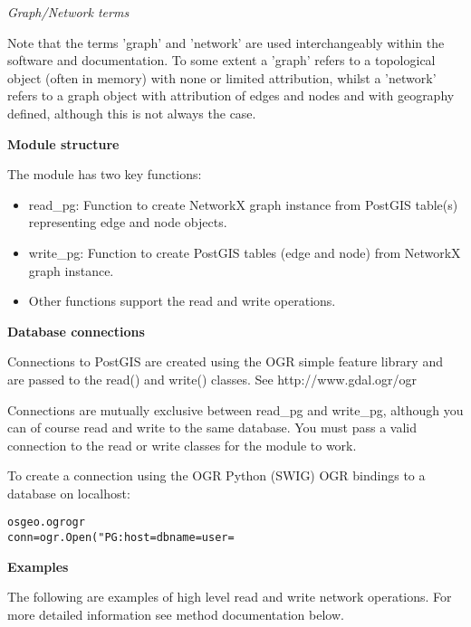 \textit{Graph/Network terms}

Note that the terms 'graph' and 'network' are used interchangeably within 
the software and documentation. To some extent a 'graph' refers to a 
topological object (often in memory) with none or limited attribution, 
whilst a 'network' refers to a graph object with attribution of edges and 
nodes and with geography defined, although this is not always the case.

\textbf{Module structure}

The module has two key functions:

\begin{itemize}
\setlength{\parskip}{0.6ex}
  \item read\_pg: Function to create NetworkX graph instance from PostGIS 
    table(s) representing edge and node objects.

  \item write\_pg: Function to create PostGIS tables (edge and node) from 
    NetworkX graph instance.

  \item Other functions support the read and write operations.

\end{itemize}

\textbf{Database connections}

Connections to PostGIS are created using the OGR simple feature library and
are passed to the read() and write() classes. See http://www.gdal.ogr/ogr

Connections are mutually exclusive between read\_pg and write\_pg, although
you can of course read and write to the same database. You must pass a 
valid connection to the read or write classes for the module to work.

To create a connection using the OGR Python (SWIG) OGR bindings to a 
database on localhost:

\begin{alltt}
\pysrcprompt{{\textgreater}{\textgreater}{\textgreater} } osgeo.ogr  ogr
\pysrcprompt{{\textgreater}{\textgreater}{\textgreater} }conn = ogr.Open("PG: host= dbname= user=
\end{alltt}
\textbf{Examples}

The following are examples of high level read and write network operations.
For more detailed information see method documentation below.

